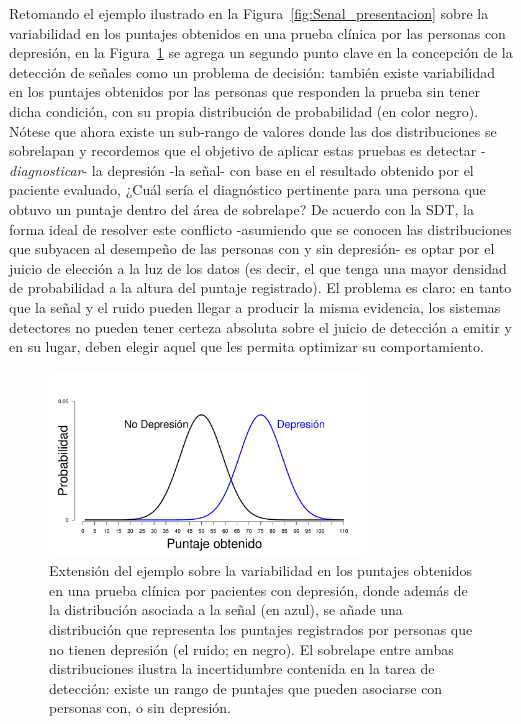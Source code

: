 Retomando el ejemplo ilustrado en la Figura~\ref{fig:Senal_presentacion} sobre la variabilidad en los puntajes obtenidos en una prueba clínica por las personas con depresión, en la Figura~\ref{fig:Noise} se agrega un segundo punto clave en la concepción de la detección de señales como un problema de decisión: también existe variabilidad en los puntajes obtenidos por las personas que responden la prueba sin tener dicha condición, con su propia distribución de probabilidad (en color negro). Nótese que ahora existe un sub-rango de valores donde las dos distribuciones se sobrelapan y recordemos que el objetivo de aplicar estas pruebas es detectar -\textit{diagnosticar}- la depresión -la señal- con base en el resultado obtenido por el paciente evaluado, ¿Cuál sería el diagnóstico pertinente para una persona que obtuvo un puntaje dentro del área de sobrelape? De acuerdo con la SDT, la forma ideal de resolver este conflicto -asumiendo que se conocen las distribuciones que subyacen al desempeño de las personas con y sin depresión- es optar por el juicio de elección  a la luz de los datos (es decir, el que tenga una mayor densidad de probabilidad a la altura del puntaje registrado). El problema es claro: en tanto que la señal y el ruido pueden llegar a producir la misma evidencia, los sistemas detectores no pueden tener certeza absoluta sobre el juicio de detección a emitir y en su lugar, deben elegir aquel que les permita optimizar su comportamiento.\\ 

\begin{figure}[th]
\centering
\includegraphics[width=0.75\textwidth]{Figures/Noise} 
\caption[Variabilidad en la señal y en el ruido]{Extensión del ejemplo sobre la variabilidad en los puntajes obtenidos en una prueba clínica por pacientes con depresión, donde además de la distribución asociada a la señal (en azul), se añade una distribución que representa los puntajes registrados por personas que no tienen depresión (el ruido; en negro). El sobrelape entre ambas distribuciones ilustra la incertidumbre contenida en la tarea de detección: existe un rango de puntajes que pueden asociarse con personas con, o sin depresión.}
\label{fig:Noise}
\end{figure}

